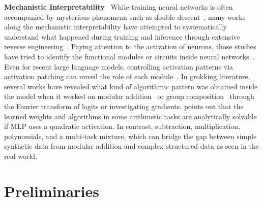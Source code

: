 \documentclass[10pt]{article} %
\newcommand{\update}[1]{{\color{black}{#1}}}
\begin{document}
\textbf{Mechanistic Interpretability}~
While training neural networks is often accompanied by mysterious phenomena such as double descent~\citep{nakkiran2019deep}, many works along the mechanistic interpretability have attempted to systematically understand what happened during training and inference through extensive reverse engineering~\citep{olah2020zoom,olsson2022context,akyurek2023what,elhage2022toy,notsawo2023predicting}.
Paying attention to the activation of neurons, those studies have tried to identify the functional modules or circuits inside neural networks~\citep{elhage2021mathematical,conmy2023automated}.
Even for recent large language models, controlling activation patterns via activation patching can unveil the role of each module~\citep{vig2020investingating,meng2023locating,zhang2024best}.
In grokking literature, several works have revealed what kind of algorithmic pattern was obtained inside the model when it worked on modular addition~\citep{zhong2023the,nanda2023progress,morwani2023feature} or group composition~\citep{chughtai2023toy,stander2023grokking} through the Fourier transform of logits or investigating gradients.
\citet{gromov2023grokking} points out that the learned weights and algorithms in some arithmetic tasks are analytically solvable if MLP uses a quadratic activation.
In contrast, \update{we extend the analysis from addition to other modular operations, such as} subtraction, multiplication, polynomials, and a multi-task mixture, which can bridge the gap between simple synthetic data from modular addition and complex structured data as seen in the real world.


% 

% 

\section{Preliminaries}
\label{sec:preliminaries}
\end{document}

